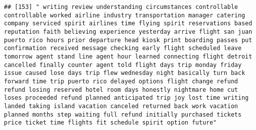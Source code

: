 \documentclass[
]{article}
\begin{document}
\begin{verbatim}
## [153] " writing review understanding circumstances controllable controllable worked airline industry transportation manager catering company serviced spirit airlines time flying spirit reservations based reputation faith believing experience yesterday arrive flight san juan puerto rico hours prior departure head kiosk print boarding passes put confirmation received message checking early flight scheduled leave tomorrow agent stand line agent hour learned connecting flight detroit cancelled finally counter agent told flight days trip monday friday issue caused lose days trip flew wednesday night basically turn back forward time trip puerto rico delayed options flight change refund refund losing reserved hotel room days honestly nightmare home cut loses proceeded refund planned anticipated trip joy lost time writing landed taking island vacation canceled returned back work vacation planned months step waiting full refund initially purchased tickets price ticket time flights fit schedule spirit option future"                                                                                                                                                                                                                                                                                                                                                                                                                                                                                                                                                                                                                                                                                                                                         

\end{verbatim}
\end{document}
